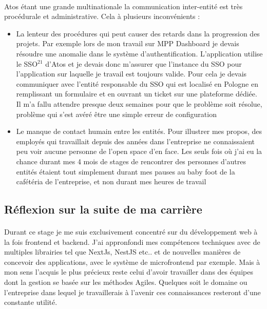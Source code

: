 \documentclass[12pt]{article}
\begin{document}
\begin {sloppypar}
\paragraph{}
Atos étant une grande multinationale la communication inter-entité est très procédurale et 
administrative. Cela à plusieurs inconvénients : 
\begin{itemize}
  \item 
    La lenteur des procédures qui peut causer des retards dans la progression des projets. Par exemple lors de mon travail 
    sur MPP Dashboard je devais résoudre une anomalie dans le système d'authentification. L'application utilise 
    le SSO$^{21}$ d'Atos et je devais donc m'assurer que l'instance du SSO pour l'application sur laquelle je travail 
    est toujours valide. Pour cela je devais communiquer avec l'entité responsable du SSO qui est localisé en Pologne 
    en remplissant un formulaire et en ouvrant un ticket sur une plateforme dédiée. Il m'a fallu attendre presque 
    deux semaines pour que le problème soit résolue, problème qui s'est avéré être une simple erreur de configuration
  \item 
    Le manque de contact humain entre les entités. Pour illustrer mes propos, des employés qui travaillait depuis
    des années dans l'entreprise ne connaissaient peu voir aucune personne de l'open space d'en face. Les 
    seuls fois où j'ai eu la chance durant mes 4 mois de stages de rencontrer des personnes d'autres entités étaient
    tout simplement durant mes pauses au baby foot de la cafétéria de l'entreprise, et non durant mes heures de travail
\end{itemize}
\newpage
\subsection{Réflexion sur la suite de ma carrière}
\paragraph{}
Durant ce stage je me suis exclusivement concentré sur du développement web à la fois frontend
et backend. J'ai appronfondi mes compétences techniques avec de multiples librairies tel que NextJs,
NestJS etc.. et de nouvelles manières de concevoir des applications, avec le système de microfrontend
par exemple. Mais à mon sens l'acquis le plus précieux reste celui d'avoir travailler dans des équipes
dont la gestion se basée sur les méthodes Agiles. Quelques soit le domaine ou l'entreprise dans lequel je travaillerais 
à l'avenir ces connaissances resteront d'une constante utilité.


\end{sloppypar}
\end{document}
